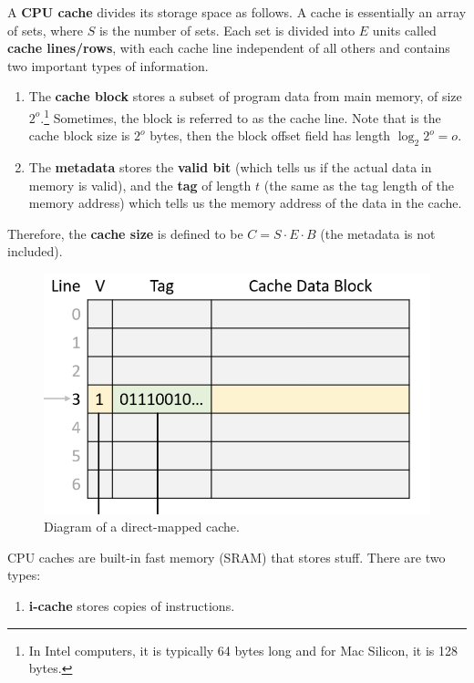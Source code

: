     \begin{definition}
      A \textbf{CPU cache} divides its storage space as follows. A cache is essentially an array of sets, where $S$ is the number of sets. Each set is divided into $E$ units called \textbf{cache lines/rows}, with each cache line independent of all others and contains two important types of information. 
      \begin{enumerate}
        \item The \textbf{cache block} stores a subset of program data from main memory, of size $2^o$.\footnote{In Intel computers, it is typically 64 bytes long and for Mac Silicon, it is 128 bytes.} Sometimes, the block is referred to as the cache line. Note that is the cache block size is $2^o$ bytes, then the block offset field has length $\log_2 2^o = o$.
        \item The \textbf{metadata} stores the \textbf{valid bit} (which tells us if the actual data in memory is valid), and the \textbf{tag} of length $t$ (the same as the tag length of the memory address) which tells us the memory address of the data in the cache. 
      \end{enumerate}
      Therefore, the \textbf{cache size} is defined to be $C = S \cdot E \cdot B$ (the metadata is not included). 
      \begin{figure}[H]
        \centering 
        \includegraphics[scale=0.4]{img/direct_mapped_cache.png}
        \caption{Diagram of a direct-mapped cache.} 
        \label{fig:direct_mapped_cache}
      \end{figure}
      CPU caches are built-in fast memory (SRAM) that stores stuff. There are two types: 
      \begin{enumerate}
        \item \textbf{i-cache} stores copies of instructions. 

\end{enumerate}
\end{definition}
